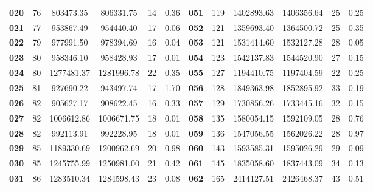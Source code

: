 \begin{table}[htbp]
{\begin{tabular}{cccccc!{\vrule width \lightrulewidth}cccccc}
    \textbf{020} & 76         & 803473.35         & 806331.75        & 14                & 0.36         & \textbf{051} & 119         & 1402893.63       & 1406356.64      & 25               & 0.25          \\
    \textbf{021} & 77         & 953867.49         & 954440.40        & 17                & 0.06         & \textbf{052} & 121         & 1359693.40       & 1364500.72      & 25               & 0.35          \\
    \textbf{022} & 79         & 977991.50         & 978394.69        & 16                & 0.04         & \textbf{053} & 121         & 1531414.60       & 1532127.28      & 28               & 0.05          \\
    \textbf{023} & 80         & 958346.10         & 958428.93        & 17                & 0.01         & \textbf{054} & 123         & 1542137.83       & 1544520.90      & 27               & 0.15          \\
    \textbf{024} & 80         & 1277481.37         & 1281996.78        & 22                & 0.35         & \textbf{055} & 127         & 1194410.75       & 1197404.59      & 22               & 0.25          \\
    \textbf{025} & 81         & 927690.22         & 943497.74        & 17                & 1.70         & \textbf{056} & 128         & 1849363.98       & 1852895.92      & 33               & 0.19          \\
    \textbf{026} & 82         & 905627.17         & 908622.45        & 16                & 0.33         & \textbf{057} & 129         & 1730856.26       & 1733445.16      & 32               & 0.15          \\
    \textbf{027} & 82         & 1006612.86         & 1006671.75        & 18                & 0.01         & \textbf{058} & 135         & 1580054.15       & 1592109.05      & 28               & 0.76          \\
    \textbf{028} & 82         & 992113.91         & 992228.95        & 18                & 0.01         & \textbf{059} & 136         & 1547056.55       & 1562026.22      & 28               & 0.97          \\
    \textbf{029} & 85         & 1189330.69         & 1200962.69        & 20                & 0.98         & \textbf{060} & 143         & 1593585.31       & 1595026.29      & 29               & 0.09          \\
    \textbf{030} & 85         & 1245755.99         & 1250981.00        & 21                & 0.42         & \textbf{061} & 145         & 1835058.60       & 1837443.09      & 34               & 0.13          \\
    \textbf{031} & 86         & 1283510.34         & 1284598.43        & 23                & 0.08         & \textbf{062} & 165         & 2414127.51       & 2426468.37      & 43               & 0.51          \\
    \bottomrule
    \end{tabular}
    }
    \end{table}